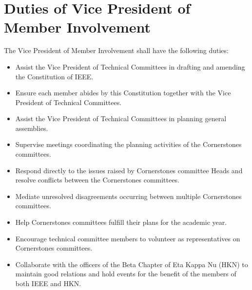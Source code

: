 \documentclass[12pt]{constitution}
\begin{document}
\section{Duties of Vice President of Member Involvement}
\label{sec:officer_vp_Inv}
The Vice President of Member Involvement shall have the following duties:
\begin{itemize}
    \item Assist the Vice President of Technical Committees in drafting and amending the Constitution of IEEE.
    \item Ensure each member abides by this Constitution together with the Vice President of Technical Committees.
    \item Assist the Vice President of Technical Committees in planning general assemblies.
    \item Supervise meetings coordinating the planning activities of the Cornerstones committees.
    \item Respond directly to the issues raised by Cornerstones committee Heads and resolve  conflicts between the Cornerstones committees.
    \item Mediate unresolved disagreements occurring between multiple Cornerstones committees.
    \item Help Cornerstones committees fulfill their plans for the academic year.
    \item Encourage technical committee members to volunteer as representatives on Cornerstones committees.
    \item Collaborate with the officers of the Beta Chapter of Eta Kappa Nu (HKN) to maintain good relations and hold events for the benefit of the members of both IEEE and HKN.
\end{itemize}
\end{document}
